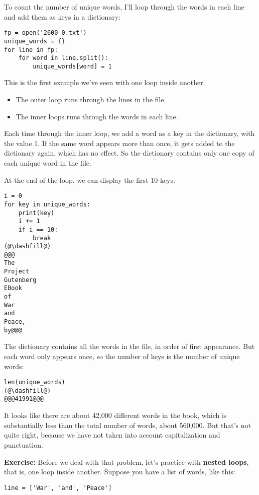To count the number of unique words, I'll loop through the words in each
line and add them as keys in a dictionary:

\begin{lstlisting}[]
fp = open('2600-0.txt')
unique_words = {}
for line in fp:
    for word in line.split():
        unique_words[word] = 1
\end{lstlisting}

This is the first example we've seen with one loop inside another.

\begin{itemize}
\item
  The outer loop runs through the lines in the file.
\item
  The inner loops runs through the words in each line.
\end{itemize}

Each time through the inner loop, we add a word as a key in the
dictionary, with the value 1. If the same word appears more than once,
it gets added to the dictionary again, which has no effect. So the
dictionary contains only one copy of each unique word in the file.

At the end of the loop, we can display the first 10 keys:

\begin{lstlisting}[]
i = 0
for key in unique_words:
    print(key)
    i += 1
    if i == 10:
        break
(@\dashfill@)
@@@
The
Project
Gutenberg
EBook
of
War
and
Peace,
by@@@
\end{lstlisting}

The dictionary contains all the words in the file, in order of first
appearance. But each word only appears once, so the number of keys is
the number of unique words:

\begin{lstlisting}[]
len(unique_words)
(@\dashfill@)
@@@41991@@@
\end{lstlisting}

It looks like there are about 42,000 different words in the book, which
is substantially less than the total number of words, about 560,000. But
that's not quite right, because we have not taken into account
capitalization and punctuation.

\textbf{Exercise:} Before we deal with that problem, let's practice with
\textbf{nested loops}, that is, one loop inside another. Suppose you
have a list of words, like this:

\begin{lstlisting}[]
line = ['War', 'and', 'Peace']
\end{lstlisting}


